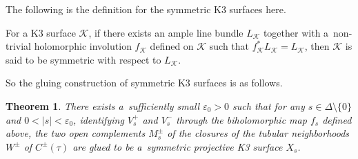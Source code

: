 \documentclass[10pt,a4paper]{amsart}
\numberwithin{equation}{section}
\newtheorem{Theorem}{Theorem}[section]
\begin{document}
The following is the definition for the symmetric K3 surfaces here.

\begin{Definition} \label{Definition2.7}
For a K3 surface $\mathcal{K}$, if there exists an ample line bundle $L_{\mathcal{K}}$ together with a~non-trivial holomorphic involution $f_{\mathcal{K}}$ defined on $\mathcal{K}$ such that $f_{\mathcal{K}}^*L_{\mathcal{K}}=L_{\mathcal{K}}$, then $\mathcal{K}$ is said to be symmetric with respect to $L_{\mathcal{K}}$.
\end{Definition}

So the gluing construction of symmetric K3 surfaces is as follows.

\begin{Theorem} \label{Theorem2.8}
There exists a~sufficiently small $\varepsilon_0 >0$ such that for any $s \in \Delta \setminus \{ 0\}$ and ${0<|s|<\varepsilon_0}$, identifying $V^{+}_s$ and $V^{-}_s$ through the biholomorphic map $f_s$ defined above, the two open complements $M^{\pm}_s$ of the closures of the tubular neighborhoods $W^{\pm}$ of $C^{\pm}(\tau)$ are glued to be a~symmetric projective K3 surface $X_s$.
\end{Theorem}
\end{document}
